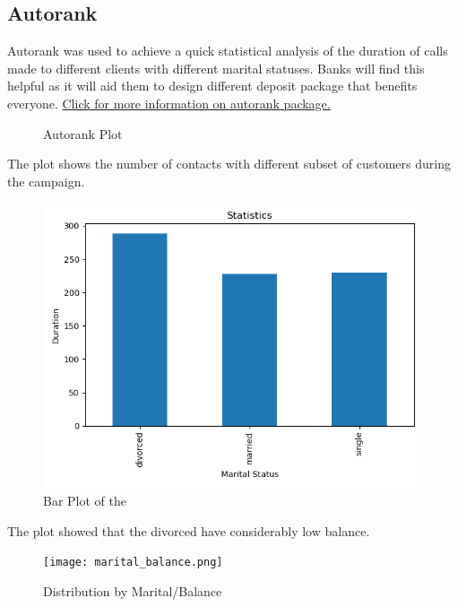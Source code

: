 \documentclass[12pt]{article}
\begin{document}
\subsection{Autorank}
Autorank was used to achieve a quick statistical analysis of the duration of calls made to different clients with different marital statuses. Banks will find this helpful as it will aid them to design different deposit package that benefits everyone.
 \href{https://pypi.org/project/autorank/#description}{Click for more information on autorank package.} 

\begin{figure}[!htbp]
	\centering
{}
	\caption{Autorank Plot}
\end{figure}
\newpage
The plot shows the number of contacts with different subset of customers during the campaign.
\begin{figure}[!htbp]
	\centering
	\includegraphics[width=15 cm]{mean.png}
	\caption{Bar Plot of the }
\end{figure}

\newpage
The plot showed that the divorced have considerably low balance. 
\begin{figure}[!htbp]
	\centering
	\texttt{[image: marital\_balance.png]}
	\caption{Distribution by Marital/Balance}
\end{figure}
\end{document}
